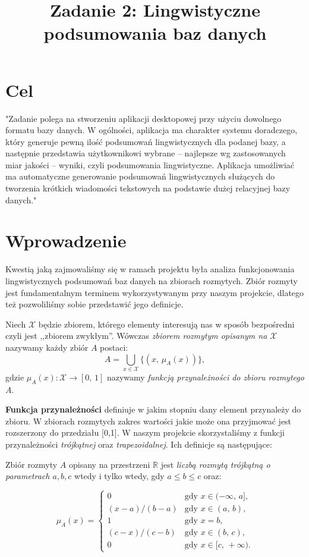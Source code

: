 \documentclass{classrep}
\author{
  \studentinfo{Piotr Traczyk}{195733} \and
  \studentinfo{Bartosz Jurczewski}{210209}
}
\title{Zadanie 2: Lingwistyczne podsumowania baz danych}
\begin{document}
\maketitle


\section{Cel}
"Zadanie polega na stworzeniu aplikacji desktopowej przy użyciu dowolnego formatu bazy danych. W ogólności, aplikacja ma charakter systemu doradczego, który generuje pewną ilość podsumowań lingwistycznych dla podanej bazy, a następnie przedstawia użytkownikowi wybrane – najlepsze wg zastosowanych miar jakości – wyniki, czyli podsumowania lingwistyczne. Aplikacja umożliwiać ma automatyczne generowanie podsumowań lingwistycznych służących do tworzenia krótkich wiadomości tekstowych na podstawie dużej relacyjnej bazy danych." \cite{tresc}

\section{Wprowadzenie}
Kwestią jaką zajmowaliśmy się w ramach projektu była analiza funkcjonowania lingwistycznych podsumowań baz danych na zbiorach rozmytych. Zbiór rozmyty jest fundamentalnym terminem wykorzystywanym przy naszym projekcie, dlatego też pozwoliliśmy sobie przedstawić jego definicje.

\begin{definition}Niech \(\mathcal{X}\) będzie zbiorem, którego elementy interesują
nas w sposób bezpośredni czyli jest ,,zbiorem zwykłym''.
Wówczas \emph{zbiorem rozmytym opisanym na \(\mathcal{X}\)}
nazywamy każdy zbiór \(A\) postaci:
\[A = \bigcup_{x \in \mathcal{X}} \{(x,\, \mu_A(x))\},\]
gdzie \(\mu_A(x) : \mathcal{X} \to [0,\,1]\) nazywamy \emph{funkcją
przynależności do zbioru rozmytego \(A\)}.
\end{definition}

\textbf{Funkcja przynależności} definiuje w jakim stopniu dany element przynależy do zbioru. W zbiorach rozmytych zakres wartości jakie może ona przyjmować jest rozszerzony do przedziału [0,1]. W naszym projekcie skorzystaliśmy z funkcji przynależności \emph{trójkątnej} oraz \emph{trapezoidalnej}. Ich definicje są następujące:

\begin{definition}
Zbiór rozmyty \(A\) opisany na przestrzeni \(\mathbb{R}\) jest
\emph{liczbą rozmytą trójkątną o parametrach \(a, b, c\)} wtedy i tylko
wtedy, gdy \(a \leq b \leq c\) oraz:

\[\mu_A(x) = \begin{cases}
0                 & \mbox{gdy } x \in (-\infty,\, a], \\
(x - a) / (b - a) & \mbox{gdy } x \in (a,\, b), \\
1                 & \mbox{gdy } x = b, \\
(c - x) / (c - b) & \mbox{gdy } x \in (b,\, c), \\
0                 & \mbox{gdy } x \in [c,\, +\infty).
\end{cases}\]
\end{definition}
\end{document}
